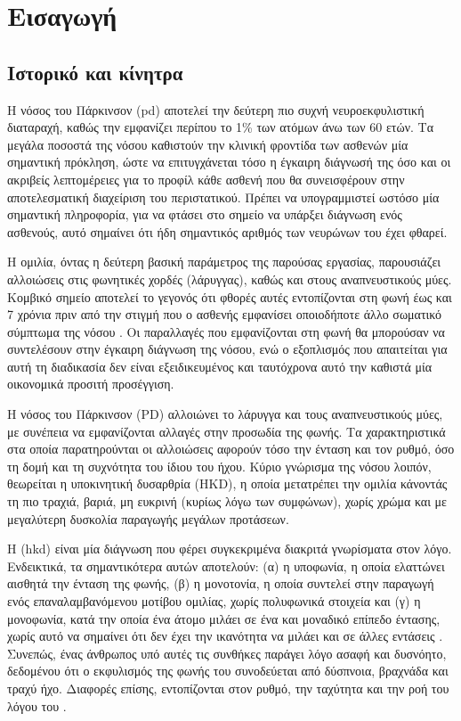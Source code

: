 
\chapter{Εισαγωγή}
\label{ch:introduction}

\section{Ιστορικό και κίνητρα}

Η νόσος του Πάρκινσον (\gls{pd}) αποτελεί την δεύτερη πιο συχνή νευροεκφυλιστική διαταραχή, καθώς την εμφανίζει περίπου το 1\% των ατόμων άνω των 60 ετών. 
Τα μεγάλα ποσοστά της νόσου καθιστούν την κλινική φροντίδα των ασθενών μία σημαντική πρόκληση, ώστε να επιτυγχάνεται τόσο η έγκαιρη διάγνωσή της όσο και οι ακριβείς λεπτομέρειες για το προφίλ κάθε ασθενή που θα συνεισφέρουν στην αποτελεσματική διαχείριση του περιστατικού. 
Πρέπει να υπογραμμιστεί ωστόσο μία σημαντική πληροφορία, για να φτάσει στο σημείο να υπάρξει διάγνωση ενός ασθενούς, αυτό σημαίνει ότι ήδη σημαντικός αριθμός των νευρώνων του έχει φθαρεί.

Η ομιλία, όντας η δεύτερη βασική παράμετρος της παρούσας εργασίας, παρουσιάζει αλλοιώσεις στις φωνητικές χορδές (λάρυγγας), καθώς και στους αναπνευστικούς μύες. 
Κομβικό σημείο αποτελεί το γεγονός ότι φθορές αυτές εντοπίζονται στη φωνή έως και 7 χρόνια πριν από την στιγμή που ο ασθενής εμφανίσει οποιοδήποτε άλλο σωματικό σύμπτωμα της νόσου \cite{harel2004acoustic}. 
Οι παραλλαγές που εμφανίζονται στη φωνή θα μπορούσαν να συντελέσουν στην έγκαιρη διάγνωση της νόσου, 
ενώ ο εξοπλισμός που απαιτείται για αυτή τη διαδικασία δεν είναι εξειδικευμένος 
και ταυτόχρονα αυτό την καθιστά μία οικονομικά προσιτή προσέγγιση\cite{little2009suitability, tsanas2010accurate}.

Η νόσος του Πάρκινσον (PD) αλλοιώνει το λάρυγγα και τους αναπνευστικούς μύες, με συνέπεια να εμφανίζονται αλλαγές στην προσωδία της φωνής. Τα χαρακτηριστικά στα οποία παρατηρούνται οι αλλοιώσεις αφορούν τόσο την ένταση και τον ρυθμό, όσο τη δομή και τη συχνότητα του ίδιου του ήχου. Κύριο γνώρισμα της νόσου λοιπόν, θεωρείται η υποκινητική δυσαρθρία (HKD), η οποία μετατρέπει την ομιλία κάνοντάς τη πιο τραχιά, βαριά, μη ευκρινή (κυρίως λόγω των συμφώνων), χωρίς χρώμα και με μεγαλύτερη δυσκολία παραγωγής μεγάλων προτάσεων.

Η (\gls{hkd}) είναι μία διάγνωση που φέρει συγκεκριμένα διακριτά γνωρίσματα στον λόγο. Ενδεικτικά, τα σημαντικότερα αυτών αποτελούν: 
(α) η υποφωνία, η οποία ελαττώνει αισθητά την ένταση της φωνής, (β) η μονοτονία, η οποία συντελεί στην παραγωγή ενός επαναλαμβανόμενου μοτίβου ομιλίας, χωρίς πολυφωνικά στοιχεία και (γ) η μονοφωνία, 
κατά την οποία ένα άτομο μιλάει σε ένα και μοναδικό επίπεδο έντασης, χωρίς αυτό να σημαίνει ότι δεν έχει την ικανότητα να μιλάει και σε άλλες εντάσεις \citep{duffy2012motor}. 
Συνεπώς, ένας άνθρωπος υπό αυτές τις συνθήκες παράγει λόγο ασαφή και δυσνόητο, δεδομένου ότι ο εκφυλισμός της φωνής του συνοδεύεται από δύσπνοια, βραχνάδα και τραχύ ήχο. 
Διαφορές επίσης, εντοπίζονται στον ρυθμό, την ταχύτητα και την ροή του λόγου του \citep{duffy2012motor}.

